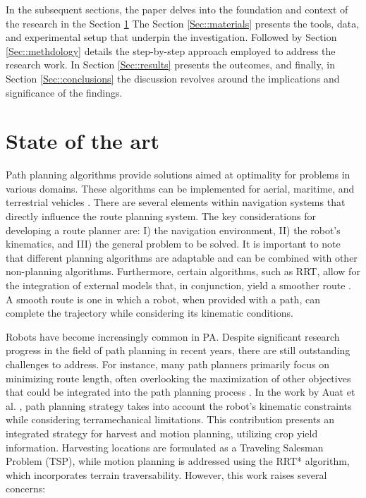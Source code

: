 \documentclass[conference]{IEEEtran}
\begin{document}
In the subsequent sections, the paper delves into the foundation and context of the research in the Section \ref{Sec::state_art} The Section \ref{Sec::materials} presents the tools, data, and experimental setup that underpin the investigation. Followed by Section \ref{Sec::methdology} details the step-by-step approach employed to address the research work. In Section \ref{Sec::results} presents the outcomes, and finally, in Section \ref{Sec::conclusions} the discussion revolves around the implications and significance of the findings.

\section{State of the art}
\label{Sec::state_art}
Path planning algorithms provide solutions aimed at optimality for problems in various domains. These algorithms can be implemented for aerial, maritime, and terrestrial vehicles \cite{Yu2021,Xie2020}. There are several elements within navigation systems that directly influence the route planning system. The key considerations for developing a route planner are: I) the navigation environment, II) the robot's kinematics, and III) the general problem to be solved. It is important to note that different planning algorithms are adaptable and can be combined with other non-planning algorithms. Furthermore, certain algorithms, such as RRT, allow for the integration of external models that, in conjunction, yield a smoother route \cite{Chen2020}. A smooth route is one in which a robot, when provided with a path, can complete the trajectory while considering its kinematic conditions.

Robots have become increasingly common in PA. Despite significant research progress in the field of path planning in recent years, there are still outstanding challenges to address. For instance, many path planners primarily focus on minimizing route length, often overlooking the maximization of other objectives that could be integrated into the path planning process \cite{Dereci2022}. In the work by Auat et al. \cite{Auat2017}, path planning strategy takes into account the robot's kinematic constraints while considering terramechanical limitations. This contribution presents an integrated strategy for harvest and motion planning, utilizing crop yield information. Harvesting locations are formulated as a Traveling Salesman Problem (TSP), while motion planning is addressed using the RRT* algorithm, which incorporates terrain traversability. However, this work raises several concerns:
\end{document}
